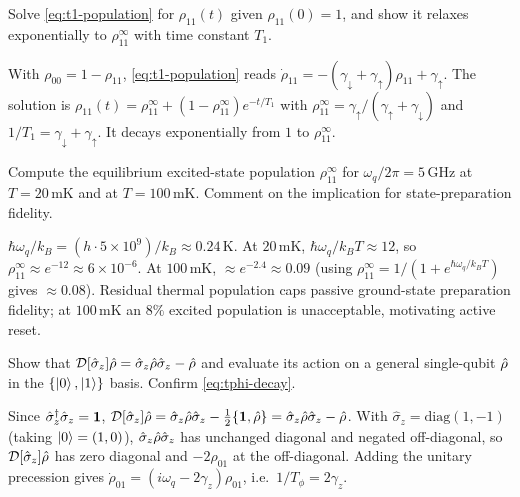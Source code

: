 \begin{exercise}
Solve \cref{eq:t1-population} for $\rho_{11}(t)$ given
$\rho_{11}(0)=1$, and show it relaxes exponentially to
$\rho_{11}^\infty$ with time constant $T_1$.
\begin{solution}
With $\rho_{00}=1-\rho_{11}$, \cref{eq:t1-population} reads
$\dot\rho_{11}=-(\gamma_\downarrow+\gamma_\uparrow)\rho_{11}+\gamma_\uparrow$.
The solution is
$\rho_{11}(t)=\rho_{11}^\infty+(1-\rho_{11}^\infty)e^{-t/T_1}$ with
$\rho_{11}^\infty=\gamma_\uparrow/(\gamma_\uparrow+\gamma_\downarrow)$
and $1/T_1=\gamma_\downarrow+\gamma_\uparrow$. It decays
exponentially from $1$ to $\rho_{11}^\infty$.
\end{solution}
\end{exercise}

\begin{exercise}
Compute the equilibrium excited-state population
$\rho_{11}^\infty$ for $\omega_q/2\pi=5\,$GHz at $T=20\,$mK and at
$T=100\,$mK. Comment on the implication for state-preparation
fidelity.
\begin{solution}
$\hbar\omega_q/k_B = (h\cdot5\times10^9)/k_B\approx 0.24\,$K. At
$20\,$mK, $\hbar\omega_q/k_BT\approx12$, so
$\rho_{11}^\infty\approx e^{-12}\approx6\times10^{-6}$. At
$100\,$mK, $\approx e^{-2.4}\approx0.09$ (using
$\rho_{11}^\infty=1/(1+e^{\hbar\omega_q/k_BT})$ gives $\approx0.08$).
Residual thermal population caps passive ground-state preparation
fidelity; at $100\,$mK an $8\%$ excited population is unacceptable,
motivating active reset.
\end{solution}
\end{exercise}

\begin{exercise}
Show that $\mathcal D[\hat\sigma_z]\hat{\rho}=\hat\sigma_z\hat{\rho}\hat\sigma_z-\hat{\rho}$
and evaluate its action on a general single-qubit $\hat{\rho}$ in the
$\{\ket0,\ket1\}$ basis. Confirm \cref{eq:tphi-decay}.
\begin{solution}
Since $\hat\sigma_z^\dagger\hat\sigma_z=\mathbf{1}$,
$\mathcal D[\hat\sigma_z]\hat{\rho}=\hat\sigma_z\hat{\rho}\hat\sigma_z-\tfrac12\{\mathbf{1},\hat{\rho}\}
=\hat\sigma_z\hat{\rho}\hat\sigma_z-\hat{\rho}$. With
$\hat\sigma_z=\mathrm{diag}(1,-1)$ (taking $\ket0=(1,0)$),
$\hat\sigma_z\hat{\rho}\hat\sigma_z$ has unchanged diagonal and negated
off-diagonal, so $\mathcal D[\hat\sigma_z]\hat{\rho}$ has zero diagonal
and $-2\rho_{01}$ at the off-diagonal. Adding the unitary precession
gives $\dot\rho_{01}=(i\omega_q-2\gamma_z)\rho_{01}$, i.e.\
$1/T_\phi=2\gamma_z$.
\end{solution}
\end{exercise}

